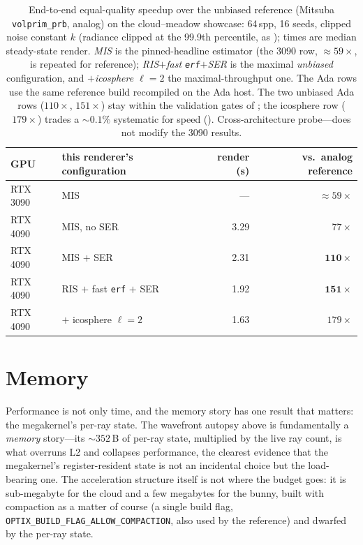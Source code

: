 \begin{table}[htp]
  \centering
  \begin{tabular}{@{}llrr@{}}
    \toprule
    GPU & this renderer's configuration & render (s) & vs.\ analog reference \\
    \midrule
    RTX 3090 & MIS                          & ---  & $\approx\!59\times$ \\
    RTX 4090 & MIS, no SER                  & 3.29 & $77\times$ \\
    RTX 4090 & MIS $+$ SER                  & 2.31 & $\mathbf{110\times}$ \\
    RTX 4090 & RIS $+$ fast \texttt{erf} $+$ SER & 1.92 & $\mathbf{151\times}$ \\
    RTX 4090 & \quad$+$ icosphere $\ell{=}2$ & 1.63 & $179\times$ \\
    \bottomrule
  \end{tabular}
  \caption{End-to-end equal-quality speedup over the unbiased reference (Mitsuba \texttt{volprim\_prb},
  analog) on the cloud--meadow showcase: \num{64}\,spp, \num{16} seeds, clipped noise constant $k$
  (radiance clipped at the \num{99.9}th percentile, as ); times are median
  steady-state render. \emph{MIS} is the pinned-headline estimator (the 3090 row, ${\approx}59\times$, is
  repeated for reference); \emph{RIS$+$fast \texttt{erf}$+$SER} is the maximal \emph{unbiased} configuration, and
  \emph{$+$icosphere $\ell{=}2$} the maximal-throughput one. The Ada rows use the same reference build
  recompiled on the Ada host. The two unbiased Ada rows ($110\times$, $151\times$) stay within the
  validation gates of ; the icosphere row ($179\times$) trades a ${\sim}\num{0.1}\%$
  systematic for speed (). Cross-architecture probe---does not modify the 3090
  results.}
  \label{tab:ser-eq}
\end{table}

\section{Memory}
\label{sec:opt-memory}

Performance is not only time, and the memory story has one result that matters: the megakernel's
per-ray state. The wavefront autopsy above is fundamentally a \emph{memory} story---its ${\sim}352$\,B
of per-ray state, multiplied by the live ray count, is what overruns L2 and collapses performance, the
clearest evidence that the megakernel's register-resident state is not an incidental choice but the
load-bearing one. The acceleration structure itself is not where the budget goes: it is sub-megabyte
for the cloud and a few megabytes for the bunny, built with compaction as a matter of course (a single
build flag, \texttt{OPTIX\_BUILD\_FLAG\_ALLOW\_COMPACTION}, also used by the reference) and dwarfed by
the per-ray state.

